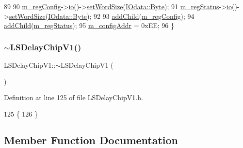 \begin{DoxyCode}
89 
90         \hyperlink{classLSDelayChipV1_afd1cfdcb114549dc1466c77f07d39fe0}{m\_regConfig}->\hyperlink{classIOobject_af04fb94137c3d86849f478ac5afab5d1}{io}()->\hyperlink{classIOdata_a20f30a9f4673713616447b1b5e9817d5}{setWordSize}(\hyperlink{classIOdata_a37c53ebf4bf8d866aac8af572962a84ca00156611f08eeb1b5d361de809dafb8e}{IOdata::Byte});
91         \hyperlink{classLSDelayChipV1_aaf118f103e89a35d2c449e8e3ffe8c20}{m\_regStatus}->\hyperlink{classIOobject_af04fb94137c3d86849f478ac5afab5d1}{io}()->\hyperlink{classIOdata_a20f30a9f4673713616447b1b5e9817d5}{setWordSize}(\hyperlink{classIOdata_a37c53ebf4bf8d866aac8af572962a84ca00156611f08eeb1b5d361de809dafb8e}{IOdata::Byte});
92 
93         \hyperlink{classHierarchy_ad677774ff38fcb257c04a3a10d471fac}{addChild}(\hyperlink{classLSDelayChipV1_afd1cfdcb114549dc1466c77f07d39fe0}{m\_regConfig});
94         \hyperlink{classHierarchy_ad677774ff38fcb257c04a3a10d471fac}{addChild}(\hyperlink{classLSDelayChipV1_aaf118f103e89a35d2c449e8e3ffe8c20}{m\_regStatus});
95         \hyperlink{classLSDelayChipV1_ab49ac38bf9e7a41ccb89c6725cfcac3a}{m\_configAddr} = 0xEE;
96     \}
\end{DoxyCode}
\mbox{\label{classLSDelayChipV1_a86c96f60b9be6f35745536df46919817}} 
\subsubsection{\texorpdfstring{$\sim$\+L\+S\+Delay\+Chip\+V1()}{~LSDelayChipV1()}}
{\footnotesize\ttfamily L\+S\+Delay\+Chip\+V1\+::$\sim$\+L\+S\+Delay\+Chip\+V1 (\begin{DoxyParamCaption}{ }\end{DoxyParamCaption})\hspace{0.3cm}{\ttfamily [inline]}}



Definition at line 125 of file L\+S\+Delay\+Chip\+V1.\+h.


\begin{DoxyCode}
125                   \{
126   \}
\end{DoxyCode}


\subsection{Member Function Documentation}
\mbox{\label{classAttrib_a235f773af19c900264a190b00a3b4ad7}} 
